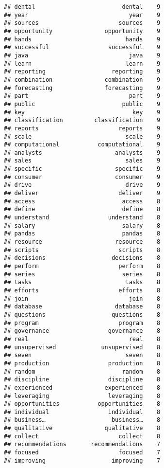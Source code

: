 \documentclass[]{article}
\begin{document}
\begin{verbatim}
## dental                         dental    9
## year                             year    9
## sources                       sources    9
## opportunity               opportunity    9
## hands                           hands    9
## successful                 successful    9
## java                             java    9
## learn                           learn    9
## reporting                   reporting    9
## combination               combination    9
## forecasting               forecasting    9
## part                             part    9
## public                         public    9
## key                               key    9
## classification         classification    9
## reports                       reports    9
## scale                           scale    9
## computational           computational    9
## analysts                     analysts    9
## sales                           sales    9
## specific                     specific    9
## consumer                     consumer    9
## drive                           drive    9
## deliver                       deliver    9
## access                         access    8
## define                         define    8
## understand                 understand    8
## salary                         salary    8
## pandas                         pandas    8
## resource                     resource    8
## scripts                       scripts    8
## decisions                   decisions    8
## perform                       perform    8
## series                         series    8
## tasks                           tasks    8
## efforts                       efforts    8
## join                             join    8
## database                     database    8
## questions                   questions    8
## program                       program    8
## governance                 governance    8
## real                             real    8
## unsupervised             unsupervised    8
## seven                           seven    8
## production                 production    8
## random                         random    8
## discipline                 discipline    8
## experienced               experienced    8
## leveraging                 leveraging    8
## opportunities           opportunities    8
## individual                 individual    8
## business…                   business…    8
## qualitative               qualitative    8
## collect                       collect    8
## recommendations       recommendations    7
## focused                       focused    7
## improving                   improving    7

\end{verbatim}
\end{document}
